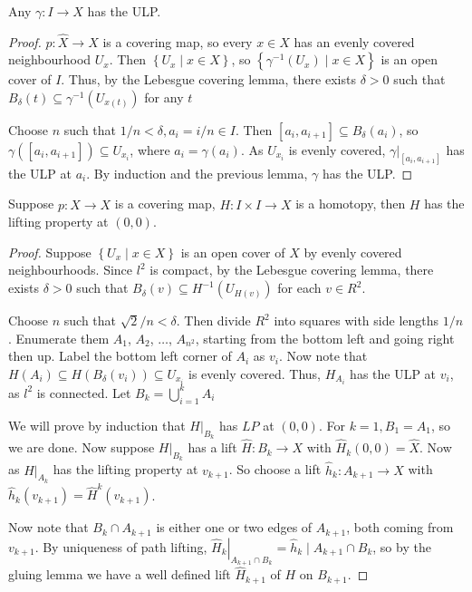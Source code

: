 \documentclass[a4paper, 10pt, twocolumn]{amsart}
\begin{document}
\begin{theorem}
  Any $\gamma: I \rightarrow X$ has the ULP.
\end{theorem}
\begin{proof}
  $p: \hat{X} \rightarrow X$ is a covering map, so every $x \in X$ has an evenly covered neighbourhood $U_x$. Then $\left\{U_x \mid x \in X\right\}$, so $\left\{\gamma^{-1}\left(U_x\right) \mid x \in X\right\}$ is an open cover of $I$. Thus, by the Lebesgue covering lemma, there exists $\delta>0$ such that $B_\delta(t) \subseteq \gamma^{-1}\left(U_{x(t)}\right)$ for any $t$

Choose $n$ such that $1 / n<\delta, a_i=i / n \in I$. Then $\left[a_i, a_{i+1}\right] \subseteq B_\delta\left(a_i\right)$, so $\gamma\left(\left[a_i, a_{i+1}\right]\right) \subseteq U_{x_i}$, where $a_i=\gamma\left(a_i\right)$. As $U_{x_i}$ is evenly covered, $\left.\gamma\right|_{\left[a_i, a_{i+1}\right]}$ has the ULP at $a_i$. By induction and the previous lemma, $\gamma$ has the ULP.
\end{proof}

\begin{theorem}
   Suppose $p: \hat{X} \rightarrow X$ is a covering map, $H: I \times I \rightarrow X$ is a homotopy, then $H$ has the lifting property at $(0,0)$.
\end{theorem}
\begin{proof}
  Suppose $\left\{U_x \mid x \in X\right\}$ is an open cover of $X$ by evenly covered neighbourhoods. Since $l^2$ is compact, by the Lebesgue covering lemma, there exists $\delta>0$ such that $B_\delta(v) \subseteq H^{-1}\left(U_{H(v)}\right)$ for each $v \in R^2$.

Choose $n$ such that $\sqrt{2} / n<\delta$. Then divide $R^2$ into squares with side lengths $1 / n$. Enumerate them $A_1$, $A_2$, $\ldots$, $A_{n^2}$, starting from the bottom left and going right then up. Label the bottom left corner of $A_i$ as $v_i$. Now note that $H\left(A_i\right) \subseteq H\left(B_\delta\left(v_i\right)\right) \subseteq U_{x_i}$ is evenly covered. Thus, $H_{A_i}$ has the ULP at $v_i$, as $l^2$ is connected. Let $B_k=\bigcup_{i=1}^k A_i$

We will prove by induction that $\left.H\right|_{B_k}$ has $L P$ at $(0,0)$. For $k=1, B_1=A_1$, so we are done. Now suppose $\left.H\right|_{B_k}$ has a lift $\hat{H}: B_k \rightarrow X$ with $\hat{H}_k(0,0)=\hat{X}$. Now as $\left.H\right|_{A_k}$ has the lifting property at $v_{k+1}$. So choose a lift $\hat{h}_k: A_{k+1} \rightarrow \hat{X}$ with $\hat{h}_k\left(v_{k+1}\right)=\hat{H}^k\left(v_{k+1}\right)$.

Now note that $B_k \cap A_{k+1}$ is either one or two edges of $A_{k+1}$, both coming from $v_{k+1}$. By uniqueness of path lifting, $\left.\hat{H}_k\right|_{A_{k+1} \cap B_k}=\hat{h}_k \mid A_{k+1} \cap B_k$, so by the gluing lemma we have a well defined lift $\hat{H}_{k+1}$ of $H$ on $B_{k+1}$.
\end{proof}
\end{document}
